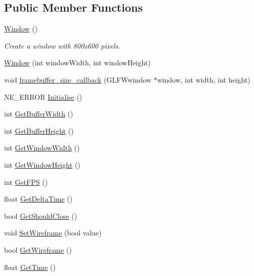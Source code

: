 \subsection*{Public Member Functions}
\begin{DoxyCompactItemize}
\item 
\mbox{\label{class_window_a74e6087da23d3c24e9fac0245e5ec92c}} 
\mbox{\hyperlink{class_window_a74e6087da23d3c24e9fac0245e5ec92c}{Window}} ()
\begin{DoxyCompactList}\small\item\em Create a window with 800x600 pixels. \end{DoxyCompactList}\item 
\mbox{\hyperlink{class_window_a3acd754419d920ce16897b8357fb705d}{Window}} (int window\+Width, int window\+Height)
\item 
void \mbox{\hyperlink{class_window_a0341974d42a2f19b6bcd32136845e3c0}{framebuffer\+\_\+size\+\_\+callback}} (G\+L\+F\+Wwindow $\ast$window, int width, int height)
\item 
N\+E\+\_\+\+E\+R\+R\+OR \mbox{\hyperlink{class_window_a07170e342d1296aebba4f4808ebb72a1}{Initialise}} ()
\item 
int \mbox{\hyperlink{class_window_a130624b840f7a1ee320a4170e4de0ddf}{Get\+Buffer\+Width}} ()
\item 
int \mbox{\hyperlink{class_window_a7d5c07e479e23d011c997681f9faebb4}{Get\+Buffer\+Height}} ()
\item 
int \mbox{\hyperlink{class_window_a098b7f2a4690ecdedaae552c5d633d9b}{Get\+Window\+Width}} ()
\item 
int \mbox{\hyperlink{class_window_a996917f9f1ef1548d52453f89814021b}{Get\+Window\+Height}} ()
\item 
int \mbox{\hyperlink{class_window_acea62a6c3bb82c234e7e33a8e53f17d8}{Get\+F\+PS}} ()
\item 
float \mbox{\hyperlink{class_window_ae7ce0586147cc93ba68d6ee929413f22}{Get\+Delta\+Time}} ()
\item 
bool \mbox{\hyperlink{class_window_af246bcd5b801ea3f10a3f66114e08ef7}{Get\+Should\+Close}} ()
\item 
void \mbox{\hyperlink{class_window_a3c24f203720fadb2b41fc26d205b5a26}{Set\+Wireframe}} (bool value)
\item 
bool \mbox{\hyperlink{class_window_a913c93756ba0357f75493ad64a265c36}{Get\+Wireframe}} ()
\item 
float \mbox{\hyperlink{class_window_af311ca905efe6256241b8076c0cef181}{Get\+Time}} ()

\end{DoxyCompactItemize}
